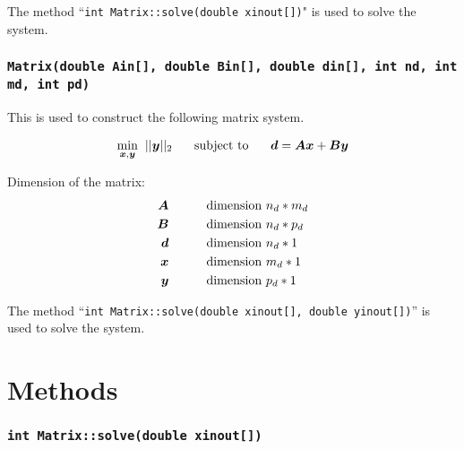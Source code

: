 \documentclass[a4paper]{article}
\begin{document}
The method ``\texttt{int Matrix::solve(double xinout[])}" is used to solve the system.


\subsubsection{\texttt{Matrix(double Ain[], double Bin[], double din[], int nd, int md, int pd)}}


This is used to construct the following matrix system.



\begin{equation*}
\begin{aligned}
\underset{\boldsymbol{x},\boldsymbol{y}}{\min} \hspace{0.2cm} || \boldsymbol{y} ||_{2}  \hspace{0.5cm} \text{ subject to } \hspace{0.5cm}  \boldsymbol{d}  = \boldsymbol{A} \boldsymbol{x} + \boldsymbol{B} \boldsymbol{y}
\end{aligned}
\end{equation*}


Dimension of the matrix: 
\begin{equation*}
\begin{aligned}
\boldsymbol{A} &\hspace{0.7cm}&& \text{dimension } n_{d}*m_{d} \\
\boldsymbol{B} &\hspace{0.7cm}&& \text{dimension } n_{d}*p_{d} \\
\boldsymbol{d} &\hspace{0.7cm}&& \text{dimension } n_{d}*1 \\
\boldsymbol{x} &\hspace{0.7cm}&& \text{dimension } m_{d}*1 \\
\boldsymbol{y} &\hspace{0.7cm}&& \text{dimension } p_{d}*1 \\
\end{aligned}
\end{equation*}
 
The method  ``\texttt{int Matrix::solve(double xinout[], double yinout[])}'' is used to solve the system.


\section{Methods} 

\subsubsection{\texttt{int Matrix::solve(double xinout[])}}
\end{document}
